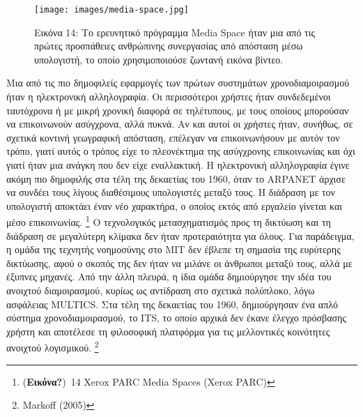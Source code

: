 \documentclass[
]{article}
\begin{document}
\leavevmode{}%
\begin{figure}
\hypertarget{fig:media-space}{%
\centering
\texttt{[image: images/media-space.jpg]}
\caption{Εικόνα 14: Το ερευνητικό πρόγραμμα Media Space ήταν μια από τις
πρώτες προσπάθειες ανθρώπινης συνεργασίας από απόσταση μέσω υπολογιστή,
το οποίο χρησιμοποιούσε ζωντανή εικόνα βίντεο.}\label{fig:media-space}
}
\end{figure}

Μια από τις πιο δημοφιλείς εφαρμογές των πρώτων συστημάτων
χρονοδιαμοιρασμού ήταν η ηλεκτρονική αλληλογραφία. Οι περισσότεροι
χρήστες ήταν συνδεδεμένοι ταυτόχρονα ή με μικρή χρονική διαφορά σε
τηλέτυπους, με τους οποίους μπορούσαν να επικοινωνούν ασύγχρονα, αλλά
πυκνά. Αν και αυτοί οι χρήστες ήταν, συνήθως, σε σχετικά κοντινή
γεωγραφική απόσταση, επέλεγαν να επικοινωνήσουν με αυτόν τον τρόπο,
γιατί αυτός ο τρόπος είχε το πλεονέκτημα της ασύγχρονης επικοινωνίας και
όχι γιατί ήταν μια ανάγκη που δεν είχε εναλλακτική. Η ηλεκτρονική
αλληλογραφία έγινε ακόμη πιο δημοφιλής στα τέλη της δεκαετίας του 1960,
όταν το ARPANET άρχισε να συνδέει τους λίγους διαθέσιμους υπολογιστές
μεταξύ τους. Η διάδραση με τον υπολογιστή αποκτάει έναν νέο χαρακτήρα, ο
οποίος εκτός από εργαλείο γίνεται και μέσο επικοινωνίας. \footnote{(\textbf{Εικόνα?})~14
  Xerox PARC Media Spaces (Xerox PARC)} Ο τεχνολογικός μετασχηματισμός
προς τη δικτύωση και τη διάδραση σε μεγαλύτερη κλίμακα δεν ήταν
προτεραιότητα για όλους. Για παράδειγμα, η ομάδα της τεχνητής νοημοσύνης
στο ΜΙΤ δεν έβλεπε τη σημασία της ευρύτερης δικτύωσης, αφού ο σκοπός της
δεν ήταν να μιλάνε οι άνθρωποι μεταξύ τους, αλλά με έξυπνες μηχανές. Από
την άλλη πλευρά, η ίδια ομάδα δημιούργησε την ιδέα του ανοιχτού
διαμοιρασμού, κυρίως ως αντίδραση στο σχετικά πολύπλοκο, λόγω ασφάλειας
MULTICS. Στα τέλη της δεκαετίας του 1960, δημιούργησαν ένα απλό σύστημα
χρονοδιαμοιρασμού, το ITS, το οποίο αρχικά δεν έκανε έλεγχο πρόσβασης
χρήστη και αποτέλεσε τη φιλοσοφική πλατφόρμα για τις μελλοντικές
κοινότητες ανοιχτού λογισμικού. \footnote{Markoff (2005)}
\end{document}
